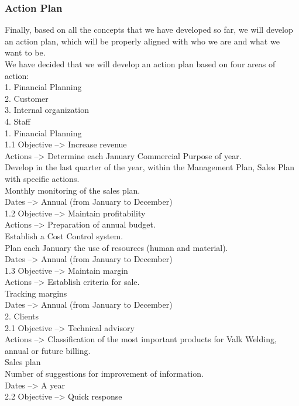 \subsubsection{Action Plan}
Finally, based on all the concepts that we have developed so far, we will develop an action plan, which will be properly aligned with who we are and what we want to be.\\
We have decided that we will develop an action plan based on four areas of action:\\
	1. Financial Planning\\
	2. Customer\\
	3. Internal organization\\
	4. Staff\\
1. Financial Planning\\
1.1 Objective --> Increase revenue\\
	Actions --> Determine each January Commercial Purpose of year.\\
				Develop in the last quarter of the year, within the Management Plan, Sales Plan with specific actions.\\
				Monthly monitoring of the sales plan.\\
	Dates --> Annual (from January to December)\\
1.2 Objective --> Maintain profitability\\
	Actions --> Preparation of annual budget.\\
				Establish a Cost Control system.\\
				Plan each January the use of resources (human and material).\\
	Dates --> Annual (from January to December)\\
1.3 Objective --> Maintain margin\\
	Actions --> Establish criteria for sale.\\
				Tracking margins\\
	Dates --> Annual (from January to December)\\
2. Clients\\
2.1 Objective --> Technical advisory\\
	Actions --> Classification of the most important products for Valk Welding, annual or future billing.\\
				Sales plan\\
				Number of suggestions for improvement of information.\\
	Dates --> A year\\
2.2 Objective --> Quick response\\
